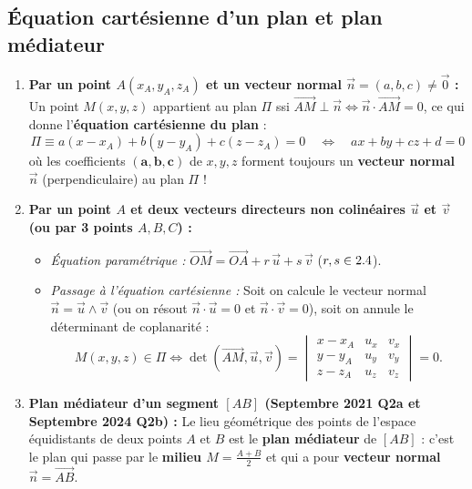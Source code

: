 \subsection{Équation cartésienne d'un plan et plan médiateur}

\begin{theoreme}
\begin{enumerate}
    \item \textbf{Par un point $A(x_A, y_A, z_A)$ et un vecteur normal $\vec{n} = (a, b, c) \neq \vec{0}$ :}
    Un point $M(x,y,z)$ appartient au plan $\Pi$ ssi $\overrightarrow{AM} \perp \vec{n} \iff \vec{n} \cdot \overrightarrow{AM} = 0$, ce qui donne l'\textbf{équation cartésienne du plan} :
    \[
        \boxed{\Pi \equiv a(x - x_A) + b(y - y_A) + c(z - z_A) = 0 \quad \Longleftrightarrow \quad ax + by + cz + d = 0}
    \]
    où les coefficients $\mathbf{(a, b, c)}$ de $x, y, z$ forment toujours un \textbf{vecteur normal $\vec{n}$} (perpendiculaire) au plan $\Pi$ !
    \item \textbf{Par un point $A$ et deux vecteurs directeurs non colinéaires $\vec{u}$ et $\vec{v}$ (ou par 3 points $A, B, C$) :}
    \begin{itemize}
        \item \emph{Équation paramétrique :} $\overrightarrow{OM} = \overrightarrow{OA} + r\,\vec{u} + s\,\vec{v}$ ($r, s \in 2.4$).
        \item \emph{Passage à l'équation cartésienne :} Soit on calcule le vecteur normal $\vec{n} = \vec{u} \wedge \vec{v}$ (ou on résout $\vec{n}\cdot\vec{u} = 0$ et $\vec{n}\cdot\vec{v} = 0$), soit on annule le déterminant de coplanarité :
        \[
            M(x,y,z) \in \Pi \iff \det(\overrightarrow{AM}, \vec{u}, \vec{v}) = \begin{vmatrix} x - x_A & u_x & v_x \\ y - y_A & u_y & v_y \\ z - z_A & u_z & v_z \end{vmatrix} = 0.
        \]
    \end{itemize}
    \item \textbf{Plan médiateur d'un segment $[AB]$ (Septembre 2021 Q2a et Septembre 2024 Q2b) :}
    Le lieu géométrique des points de l'espace équidistants de deux points $A$ et $B$ est le \textbf{plan médiateur} de $[AB]$ : c'est le plan qui passe par le \textbf{milieu $M = \frac{A+B}{2}$} et qui a pour \textbf{vecteur normal $\vec{n} = \overrightarrow{AB}$}.
\end{enumerate}
\end{theoreme}

